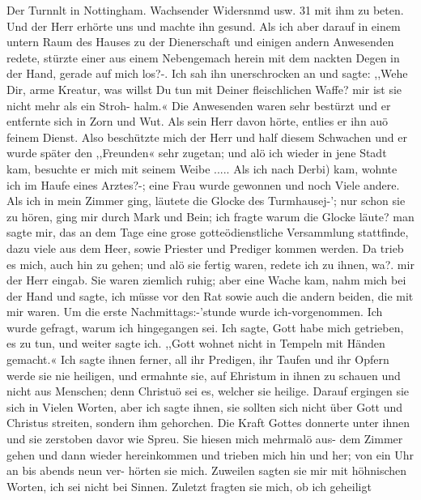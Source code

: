 Der Turnnlt in Nottingham. Wachsender Widersnmd usw. 31
mit ihm zu beten. Und der Herr erhörte uns und machte ihn
gesund. Als ich aber darauf in einem untern Raum des Hauses
zu der Dienerschaft und einigen andern Anwesenden redete, stürzte
einer aus einem Nebengemach herein mit dem nackten Degen in
der Hand, gerade auf mich los?-. Ich sah ihn unerschrocken an
und sagte: ,,Wehe Dir, arme Kreatur, was willst Du tun mit
Deiner fleischlichen Waffe? mir ist sie nicht mehr als ein Stroh-
halm.« Die Anwesenden waren sehr bestürzt und er entfernte
sich in Zorn und Wut. Als sein Herr davon hörte, entlies er
ihn auö feinem Dienst. Also beschützte mich der Herr und half
diesem Schwachen und er wurde später den ,,Freunden« sehr
zugetan; und alö ich wieder in jene Stadt kam, besuchte er mich
mit seinem Weibe .....
Als ich nach Derbi) kam, wohnte ich im Haufe eines Arztes?-;
eine Frau wurde gewonnen und noch Viele andere. Als ich in
mein Zimmer ging, läutete die Glocke des Turmhausej-’; nur schon
sie zu hören, ging mir durch Mark und Bein; ich fragte warum
die Glocke läute? man sagte mir, das an dem Tage eine grose
gotteödienstliche Versammlung stattfinde, dazu viele aus dem
Heer, sowie Priester und Prediger kommen werden. Da trieb
es mich, auch hin zu gehen; und alö sie fertig waren, redete ich
zu ihnen, wa?. mir der Herr eingab. Sie waren ziemlich ruhig;
aber eine Wache kam, nahm mich bei der Hand und sagte, ich
müsse vor den Rat sowie auch die andern beiden, die mit mir
waren. Um die erste Nachmittags:-’stunde wurde ich-vorgenommen.
Ich wurde gefragt, warum ich hingegangen sei. Ich sagte, Gott
habe mich getrieben, es zu tun, und weiter sagte ich. ,,Gott
wohnet nicht in Tempeln mit Händen gemacht.« Ich sagte ihnen
ferner, all ihr Predigen, ihr Taufen und ihr Opfern werde sie
nie heiligen, und ermahnte sie, auf Ehristum in ihnen zu schauen
und nicht aus Menschen; denn Christuö sei es, welcher sie heilige.
Darauf ergingen sie sich in Vielen Worten, aber ich sagte ihnen,
sie sollten sich nicht über Gott und Christus streiten, sondern
ihm gehorchen. Die Kraft Gottes donnerte unter ihnen und
sie zerstoben davor wie Spreu. Sie hiesen mich mehrmalö
aus- dem Zimmer gehen und dann wieder hereinkommen und
trieben mich hin und her; von ein Uhr an bis abends neun ver-
hörten sie mich. Zuweilen sagten sie mir mit höhnischen Worten,
ich sei nicht bei Sinnen. Zuletzt fragten sie mich, ob ich geheiligt


